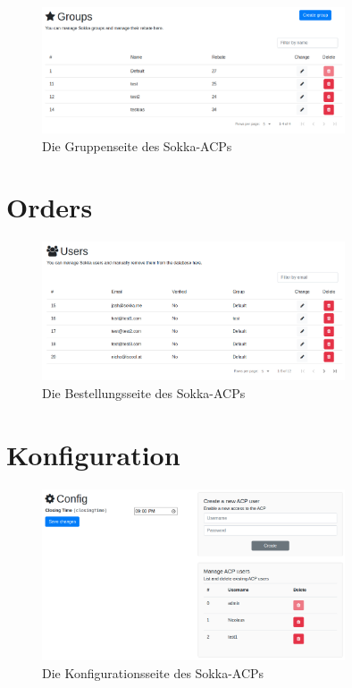\begin{figure}[ht]
    \centering
    \includegraphics[width=0.8\textwidth]{images/ACP/groups.png}
    \caption{Die Gruppenseite des Sokka-ACPs}
\end{figure}

\section{Orders}

\begin{figure}[ht]
    \centering
    \includegraphics[width=0.8\textwidth]{images/ACP/users-page.png}
    \caption{Die Bestellungsseite des Sokka-ACPs}
\end{figure}

\section{Konfiguration}

\begin{figure}[ht]
    \centering
    \includegraphics[width=0.8\textwidth]{images/ACP/config.png}
    \caption{Die Konfigurationsseite des Sokka-ACPs}
\end{figure}